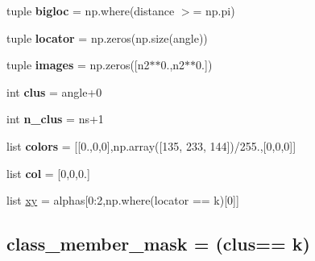 \begin{DoxyCompactItemize}
\item 
\hypertarget{namespace_m2_c_a_d_1_1pca__ring__spectrum_a072103707b6a03d86f93d223d58467c7}{}tuple {\bfseries bigloc} = np.\+where(distance $>$= np.\+pi)\label{namespace_m2_c_a_d_1_1pca__ring__spectrum_a072103707b6a03d86f93d223d58467c7}

\item 
\hypertarget{namespace_m2_c_a_d_1_1pca__ring__spectrum_a4a2aaaefcdede10033e8c697a05fd306}{}tuple {\bfseries locator} = np.\+zeros(np.\+size(angle))\label{namespace_m2_c_a_d_1_1pca__ring__spectrum_a4a2aaaefcdede10033e8c697a05fd306}

\item 
\hypertarget{namespace_m2_c_a_d_1_1pca__ring__spectrum_adccafabdaf10097aa744fbe8716200d2}{}tuple {\bfseries images} = np.\+zeros(\mbox{[}n2$\ast$$\ast$0.,n2$\ast$$\ast$0.\mbox{]})\label{namespace_m2_c_a_d_1_1pca__ring__spectrum_adccafabdaf10097aa744fbe8716200d2}

\item 
\hypertarget{namespace_m2_c_a_d_1_1pca__ring__spectrum_a2073e72809578482d5837add75700fcd}{}int {\bfseries clus} = angle+0\label{namespace_m2_c_a_d_1_1pca__ring__spectrum_a2073e72809578482d5837add75700fcd}

\item 
\hypertarget{namespace_m2_c_a_d_1_1pca__ring__spectrum_a4339c97baf1675fcd5bb8dd3d800acbd}{}int {\bfseries n\+\_\+clus} = ns+1\label{namespace_m2_c_a_d_1_1pca__ring__spectrum_a4339c97baf1675fcd5bb8dd3d800acbd}

\item 
\hypertarget{namespace_m2_c_a_d_1_1pca__ring__spectrum_a0c492be929ac110268db30ded64b9301}{}list {\bfseries colors} = \mbox{[}\mbox{[}0.,0,0\mbox{]},np.\+array(\mbox{[}135, 233, 144\mbox{]})/255.,\mbox{[}0,0,0\mbox{]}\mbox{]}\label{namespace_m2_c_a_d_1_1pca__ring__spectrum_a0c492be929ac110268db30ded64b9301}

\item 
\hypertarget{namespace_m2_c_a_d_1_1pca__ring__spectrum_a0d819d653099fa8cc7910fcdcfbe3e72}{}list {\bfseries col} = \mbox{[}0,0,0.\mbox{]}\label{namespace_m2_c_a_d_1_1pca__ring__spectrum_a0d819d653099fa8cc7910fcdcfbe3e72}

\item 
\hypertarget{namespace_m2_c_a_d_1_1pca__ring__spectrum_af837db34b918fb0d5628dfc8f8b7a48c}{}list \hyperlink{namespace_m2_c_a_d_1_1pca__ring__spectrum_af837db34b918fb0d5628dfc8f8b7a48c}{xy} = alphas\mbox{[}0\+:2,np.\+where(locator == k)\mbox{[}0\mbox{]}\mbox{]}\label{namespace_m2_c_a_d_1_1pca__ring__spectrum_af837db34b918fb0d5628dfc8f8b7a48c}

\begin{DoxyCompactList}\small\item\em \subsection*{class\+\_\+member\+\_\+mask = (clus== k)}\end{DoxyCompactList}\end{DoxyCompactItemize}



